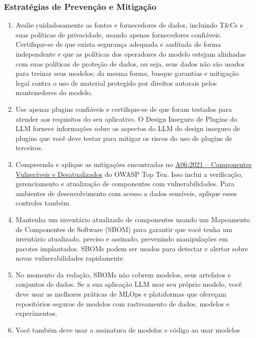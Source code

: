 \documentclass[
]{article}
\providecommand{\tightlist}{%
  \setlength{\itemsep}{0pt}\setlength{\parskip}{0pt}}
\begin{document}
\subsubsection{Estratégias de Prevenção e
Mitigação}\label{estratuxe9gias-de-prevenuxe7uxe3o-e-mitigauxe7uxe3o}

\begin{enumerate}
\def\labelenumi{\arabic{enumi}.}
\tightlist
\item
  Avalie cuidadosamente as fontes e fornecedores de dados, incluindo
  T\&Cs e suas políticas de privacidade, usando apenas fornecedores
  confiáveis. Certifique-se de que exista segurança adequada e auditada
  de forma independente e que as políticas dos operadores do modelo
  estejam alinhadas com suas políticas de proteção de dados, ou seja,
  seus dados não são usados para treinar seus modelos; da mesma forma,
  busque garantias e mitigação legal contra o uso de material protegido
  por direitos autorais pelos mantenedores do modelo.
\item
  Use apenas plugins confiáveis e certifique-se de que foram testados
  para atender aos requisitos do seu aplicativo. O Design Inseguro de
  Plugins do LLM fornece informações sobre os aspectos do LLM do design
  inseguro de plugins que você deve testar para mitigar os riscos do uso
  de plugins de terceiros.
\item
  Compreenda e aplique as mitigações encontradas no
  \href{https://owasp.org/Top10/A06_2021-Vulnerable_and_Outdated_Components/}{A06:2021
  -- Componentes Vulneráveis e Desatualizados} do OWASP Top Ten. Isso
  inclui a verificação, gerenciamento e atualização de componentes com
  vulnerabilidades. Para ambientes de desenvolvimento com acesso a dados
  sensíveis, aplique esses controles também.
\item
  Mantenha um inventário atualizado de componentes usando um Mapeamento
  de Componentes de Software (SBOM) para garantir que você tenha um
  inventário atualizado, preciso e assinado, prevenindo manipulações em
  pacotes implantados. SBOMs podem ser usados para detectar e alertar
  sobre novas vulnerabilidades rapidamente.
\item
  No momento da redação, SBOMs não cobrem modelos, seus artefatos e
  conjuntos de dados. Se a sua aplicação LLM usar seu próprio modelo,
  você deve usar as melhores práticas de MLOps e plataformas que
  ofereçam repositórios seguros de modelos com rastreamento de dados,
  modelos e experimentos.
\item
  Você também deve usar a assinatura de modelos e código ao usar modelos

\end{enumerate}
\end{document}

